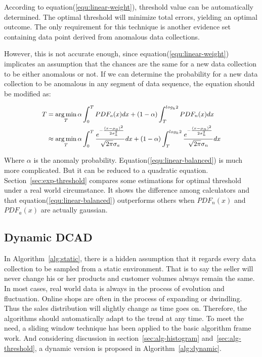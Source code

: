 \documentclass[10pt,conference,letterpaper]{IEEEtran}
\begin{document}
			According to equation(\ref{equ:linear-weight}), threshold value can be automatically determined. The optimal threshold will minimize total errors, yielding an optimal outcome. The only requirement for this technique is another evidence set containing data point derived from anomalous data collections.
			
			However, this is not accurate enough, since equation(\ref{equ:linear-weight}) implicates an assumption that the chances are the same for a new data collection to be either anomalous or not. If we can determine the probability for a new data collection to be anomalous in any segment of data sequence, the equation should be modified as:
	
			\begin{equation}\label{equ:linear-balanced}
				{\footnotesize
				\begin{split}
					T & = \mathop{\arg\min}_{T} \alpha\int_{0}^{T}PDF_{a}(x)dx +
					(1-\alpha)\int_{T}^{log_k2}PDF_{n}(x)dx\\
					& \approx \mathop{\arg\min}_{T}
					\alpha\int_{0}^{T}
					\frac{e^{-\frac{(x - \mu_a)^2}{2\sigma_a^2}}}{\sqrt{2\pi} \sigma_a}dx
					+ 
					(1-\alpha)\int_{T}^{log_k2}
					\frac{e^{-\frac{(x - \mu_n)^2}{2\sigma_n^2}}}{\sqrt{2\pi} \sigma_n}dx
				\end{split}}
			\end{equation}
	
			Where $\alpha$ is the anomaly probability. Equation(\ref{equ:linear-balanced}) is much more complicated. But it can be reduced to a quadratic equation.
			Section~\ref{sec:exp-threshold} compares some estimations for optimal threshold under a real world circumstance. It shows the difference among calculators and that equation(\ref{equ:linear-balanced}) outperforms others when $PDF_n(x)$ and $PDF_a(x)$ are actually gaussian.
	
		\subsection{Dynamic DCAD}\label{sec:alg-dynamic}
			In Algorithm~\ref{alg:static}, there is a hidden assumption that it regards every data collection to be sampled from a static environment. That is to say the seller will never change his or her products and customer volumes always remain the same. In most cases, real world data is always in the process of evolution and fluctuation. Online shops are often in the process of expanding or dwindling. Thus the sales distribution will slightly change as time goes on. Therefore, the algorithms should automatically adapt to the trend at any time. To meet the need, a sliding window technique has been applied to the basic algorithm frame work. And considering discussion in section~\ref{sec:alg-histogram} and~\ref{sec:alg-threshold}, a dynamic version is proposed in Algorithm~\ref{alg:dynamic}.
	
\end{document}
